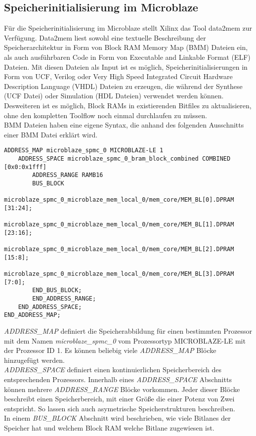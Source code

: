 \subsection{Speicherinitialisierung im Microblaze}
Für die Speicherinitialisierung im Microblaze stellt Xilinx das Tool data2mem zur Verfügung. \cite{DATA2MEM}
Data2mem liest sowohl eine textuelle Beschreibung der Speicherarchitektur in Form von Block RAM Memory Map (BMM) Dateien ein, als auch ausführbaren Code in Form von Executable and Linkable Format (ELF) Dateien. Mit diesen Dateien als Input ist es möglich, Speicherinitialisierungen in Form von UCF, Verilog oder Very High Speed Integrated Circuit Hardware Description Language (VHDL) Dateien zu erzeugen, die während der Synthese (UCF Datei) oder Simulation (HDL Dateien) verwendet werden können. Desweiteren ist es möglich, Block RAMs in existierenden Bitfiles zu aktualisieren, ohne den kompletten Toolflow noch einmal durchlaufen zu müssen.\\
BMM Dateien haben eine eigene Syntax, die anhand des folgenden Ausschnitts einer BMM Datei erklärt wird.
\newpage
\begin{lstlisting}
ADDRESS_MAP microblaze_spmc_0 MICROBLAZE-LE 1
	ADDRESS_SPACE microblaze_spmc_0_bram_block_combined COMBINED [0x0:0x1fff]
		ADDRESS_RANGE RAMB16
		BUS_BLOCK
			microblaze_spmc_0_microblaze_mem_local_0/mem_core/MEM_BL[0].DPRAM [31:24];
			microblaze_spmc_0_microblaze_mem_local_0/mem_core/MEM_BL[1].DPRAM [23:16];
			microblaze_spmc_0_microblaze_mem_local_0/mem_core/MEM_BL[2].DPRAM [15:8];
			microblaze_spmc_0_microblaze_mem_local_0/mem_core/MEM_BL[3].DPRAM [7:0];
		END_BUS_BLOCK;
		END_ADDRESS_RANGE;
	END_ADDRESS_SPACE;
END_ADDRESS_MAP;
\end{lstlisting}
\textit{ADDRESS\_MAP} definiert die Speicherabbildung für einen bestimmten Prozessor mit dem Namen \textit{microblaze\_spmc\_0} vom Prozessortyp MICROBLAZE-LE mit der Prozessor ID 1. Es können beliebig viele \textit{ADDRESS\_MAP} Blöcke hinzugefügt werden.\\ \textit{ADDRESS\_SPACE} definiert einen kontinuierlichen Speicherbereich des entsprechenden Prozessors. Innerhalb eines \textit{ADDRESS\_SPACE} Abschnitts können mehrere \textit{ADDRESS\_RANGE} Blöcke vorkommen. Jeder dieser Blöcke beschreibt einen Speicherbereich, mit einer Größe die einer Potenz von Zwei entspricht. So lassen sich auch asymetrische Speicherstrukturen beschreiben.\\
In einem \textit{BUS\_BLOCK} Abschnitt wird beschrieben, wie viele Bitlanes der Speicher hat und welchem Block RAM welche Bitlane zugewiesen ist.

